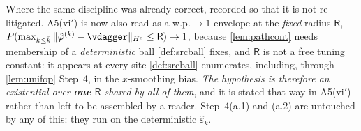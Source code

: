 \begin{remark}
Where the same discipline was already correct, recorded so that it is not re-litigated.
A5(vi$'$) is now also read as a w.p.$\to1$ envelope at the \emph{fixed} radius $\mathsf R$, 
$P(\max_{k\le\bar k}\|\hat\varphi^{(k)}-\vdagger\|_{H^{s}}\le\mathsf R)\to1$, because
\cref{lem:pathcont} needs membership of a \emph{deterministic} ball \cref{def:srcball} fixes, and
$\mathsf R$ is not a free tuning constant: it appears at every site \cref{def:srcball} enumerates,
including, through \cref{lem:unifop} Step~4, in the $x$-smoothing bias. \emph{The hypothesis is therefore
an existential over \textbf{one} $\mathsf R$ shared by all of them}, and it is stated that way in
A5(vi$'$) rather than left to be assembled by a reader. Step~4(a.1) and (a.2) are untouched by any of
this: they run on the deterministic $\hat\varepsilon_k$.
\end{remark}

